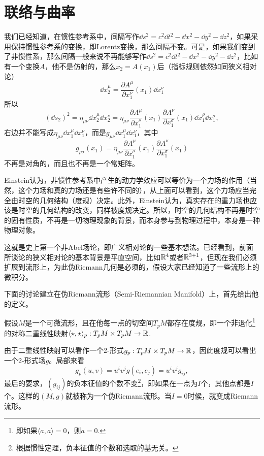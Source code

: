 \newcommand{\gl}{\mathfrak{gl}}
\newcommand{\lag}{{\mathfrak{g}}}
\newcommand{\ad}{\mathrm{ad}}

\chapter{联络与曲率}
我们已经知道，在惯性参考系中，间隔写作$\dd s^2=c^2 \dd t^2-\dd x^2-\dd y^2-\dd z^2$，如果采用保持惯性参考系的变换，即Lorentz变换，那么间隔不变。可是，如果我们变到了非惯性系，那么间隔一般来说不再能够写作$\dd s^2=c^2 \dd t^2-\dd x^2-\dd y^2-\dd z^2$，比如有一个变换$A$，他不是仿射的，那么$x_2=A(x_1)$后（指标规则依然如同狭义相对论）
\[
	\dd x_2^\mu=\frac{\partial A^\mu}{\partial x_1^\nu}(x_1)\dd x_1^\nu
\]
所以
\[
	(\dd s_2)^2=\eta_{\mu\nu}\dd x_2^\mu\dd x_2^\nu=\eta_{\mu\nu}\frac{\partial A^\mu}{\partial x_1^\rho}(x_1)\frac{\partial A^\nu}{\partial x_1^\sigma}(x_1)\dd x_1^\rho\dd x_1^\sigma,
\]
右边并不能写成$\eta_{\mu\nu}\dd x_1^\mu\dd x_1^\nu$，而是$g_{\mu\nu}\dd x_1^\mu\dd x_1^\nu$，其中
\[
	g_{\rho\sigma}(x_1)=\eta_{\mu\nu}\frac{\partial A^\mu}{\partial x_1^\rho}(x_1)\frac{\partial A^\nu}{\partial x_1^\sigma}(x_1)
\]
不再是对角的，而且也不再是一个常矩阵。

Einstein认为，非惯性参考系中产生的动力学效应可以等价为一个力场的作用（当然，这个力场和真的力场还是有些许不同的），从上面可以看到，这个力场应当完全由时空的几何结构（度规）决定。此外，Einstein认为，真实存在的重力场也应该是时空的几何结构的改变，同样被度规决定。所以，时空的几何结构不再是时空的固有性质，不再是一切物理现象的背景，而本身参与到物理过程中，本身是一种物理对象。

这就是史上第一个非Abel场论，即广义相对论的一些基本想法。已经看到，前面所谈论的狭义相对论的基本背景是平直空间，比如$\mathbb{R}^4$或者$\mathbb{R}^{3+1}$，但现在我们必须扩展到流形上，为此伪Riemann几何是必须的，假设大家已经知道了一些流形上的微积分。

下面的讨论建立在伪Riemann流形（Semi-Riemannian Manifold）上，首先给出他的定义。

\begin{defi}
假设$M$是一个可微流形，且在他每一点的切空间$T_pM$都存在度规，即一个非退化\footnote{即如果$\langle a,a\rangle=0$，则$a=0$.}的对称二重线性映射$\langle\star,\star\rangle_p:T_pM\times T_pM\to \mathbb{R}$.

由于二重线性映射可以看作一个2-形式$g_p:T_pM\times T_pM\to \mathbb{R}$，因此度规可以看出一个2-形式场$g$。局部来看
\[
	g_p(u,v)=u^iv^jg(e_i,e_j)=u^iv^jg_{ij},
\]
最后的要求，$(g_{ij})$的负本征值的个数不变\footnote{根据惯性定理，负本征值的个数和选取的基无关。}，即如果在一点为$I$个，其他点都是$I$个。这样的$(M,g)$就被称为一个伪Riemann流形。当$I=0$时候，就变成Riemann流形。
\end{defi}

